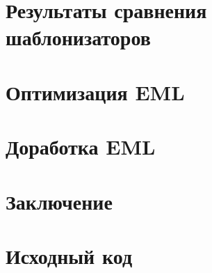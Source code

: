 \section{Результаты сравнения шаблонизаторов}


\section{Оптимизация EML}


\section{Доработка EML}


\section*{Заключение}





\appendix
\section*{Исходный код}


